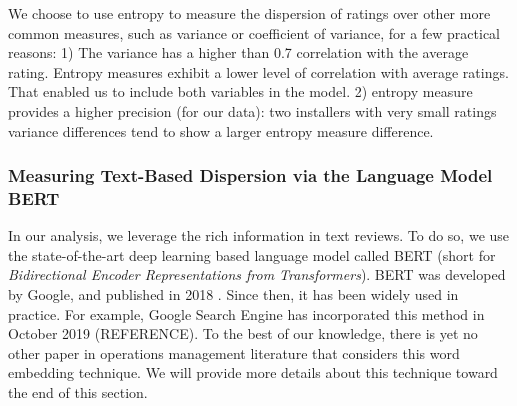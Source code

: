 \documentclass[msom,blindrev]{informs3}
\begin{document}
We choose to use entropy to measure the dispersion of ratings over other more common measures, such as variance or coefficient of variance,  for a few practical reasons: 1) The variance has a higher than 0.7 correlation with the average rating. Entropy measures exhibit a lower level of correlation with average ratings. That enabled us to include both variables in the model. 2) entropy measure provides a higher precision (for our data): two installers with very small ratings variance differences tend to show a larger entropy measure difference. \\

\subsubsection{Measuring Text-Based Dispersion via the Language Model BERT} \label{Subsec: Define Txt Ent}

In our analysis, we leverage the rich information in text reviews. To do so, we use the state-of-the-art deep learning based language model called BERT (short for \textit{Bidirectional Encoder Representations from Transformers}). BERT was developed by Google, and published in 2018 \citep{devlin2018bert}. Since then, it has been widely used in practice. For example, Google Search Engine has incorporated this method in October 2019 (REFERENCE). To the best of our knowledge, there is yet no other paper in operations management literature that considers this word embedding technique. We will provide more details about this technique toward the end of this section.
\end{document}
